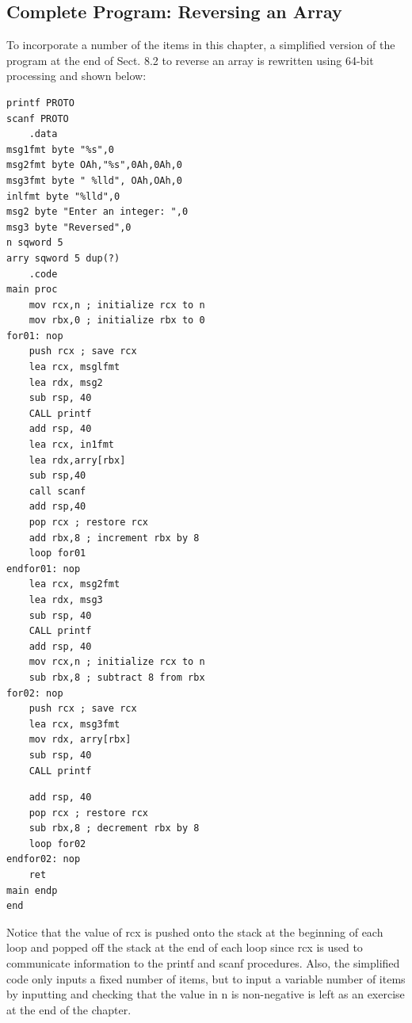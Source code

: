 \documentclass[10pt]{book}
\begin{document}
\subsection{Complete Program: Reversing an Array}
To incorporate a number of the items in this chapter, a simplified version of the program at the end of Sect. 8.2 to reverse an array is rewritten using 64-bit processing and shown below:

\begin{verbatim}
printf PROTO
scanf PROTO
    .data
msg1fmt byte "%s",0
msg2fmt byte OAh,"%s",0Ah,0Ah,0
msg3fmt byte " %lld", OAh,OAh,0
inlfmt byte "%lld",0
msg2 byte "Enter an integer: ",0
msg3 byte "Reversed",0
n sqword 5
arry sqword 5 dup(?)
    .code
main proc
    mov rcx,n ; initialize rcx to n
    mov rbx,0 ; initialize rbx to 0
for01: nop
    push rcx ; save rcx
    lea rcx, msglfmt
    lea rdx, msg2
    sub rsp, 40
    CALL printf
    add rsp, 40
    lea rcx, in1fmt
    lea rdx,arry[rbx]
    sub rsp,40
    call scanf
    add rsp,40
    pop rcx ; restore rcx
    add rbx,8 ; increment rbx by 8
    loop for01
endfor01: nop
    lea rcx, msg2fmt
    lea rdx, msg3
    sub rsp, 40
    CALL printf
    add rsp, 40
    mov rcx,n ; initialize rcx to n
    sub rbx,8 ; subtract 8 from rbx
for02: nop
    push rcx ; save rcx
    lea rcx, msg3fmt
    mov rdx, arry[rbx]
    sub rsp, 40
    CALL printf
\end{verbatim}

\begin{verbatim}
    add rsp, 40
    pop rcx ; restore rcx
    sub rbx,8 ; decrement rbx by 8
    loop for02
endfor02: nop
    ret
main endp
end
\end{verbatim}

Notice that the value of rcx is pushed onto the stack at the beginning of each loop and popped off the stack at the end of each loop since rcx is used to communicate information to the printf and scanf procedures. Also, the simplified code only inputs a fixed number of items, but to input a variable number of items by inputting and checking that the value in n is non-negative is left as an exercise at the end of the chapter.


\end{document}
